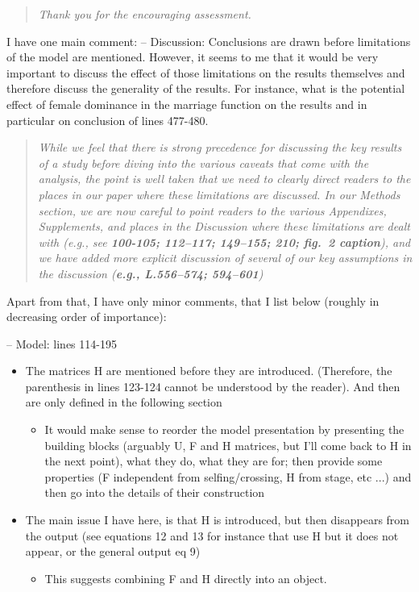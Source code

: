 \documentclass[11pt]{article}
\begin{document}
\begin{quote}
	{\itshape Thank you for the encouraging assessment.}
\end{quote}

I have one main comment:
-- Discussion: Conclusions are drawn before limitations of the model are mentioned. However, it seems to me that it would be very important to discuss the effect of those limitations on the results themselves and therefore discuss the generality of the results. For instance, what is the potential effect of female dominance in the marriage function on the results and in particular on conclusion of lines 477-480.

\begin{quote}
	{\itshape While we feel that there is strong precedence for discussing the key results of a study before diving into the various caveats that come with the analysis, the point is well taken that we need to clearly direct readers to the places in our paper where these limitations are discussed. In our Methods section, we are now careful to point readers to the various Appendixes, Supplements, and places in the Discussion where these limitations are dealt with (e.g., see {\bf 100-105; 112--117; 149--155; 210; fig.~2 caption}), and we have added more explicit discussion of several of our key assumptions in the discussion ({\bf e.g., L.556--574; 594--601})}
\end{quote}

\noindent Apart from that, I have only minor comments, that I list below (roughly in decreasing order of importance):
\bigskip 

\noindent -- Model: lines 114-195
\begin{itemize}
	\item The matrices H are mentioned before they are introduced. (Therefore, the parenthesis in lines 123-124 cannot be understood by the reader). And then are only defined in the following section	
	\begin{itemize}
		\item It would make sense to reorder the model presentation by presenting the building blocks (arguably U, F and H matrices, but I'll come back to H in the next point), what they do, what they are for; then provide some properties (F independent from selfing/crossing, H from stage, etc ...) and then go into the details of their construction
	\end{itemize}
	\item The main issue I have here, is that H is introduced, but then disappears from the output (see equations 12 and 13 for instance that use H but it does not appear, or the general output eq 9)
	\begin{itemize}
		\item This suggests combining F and H directly into an object.
	\end{itemize}
\end{itemize}
\end{document}
